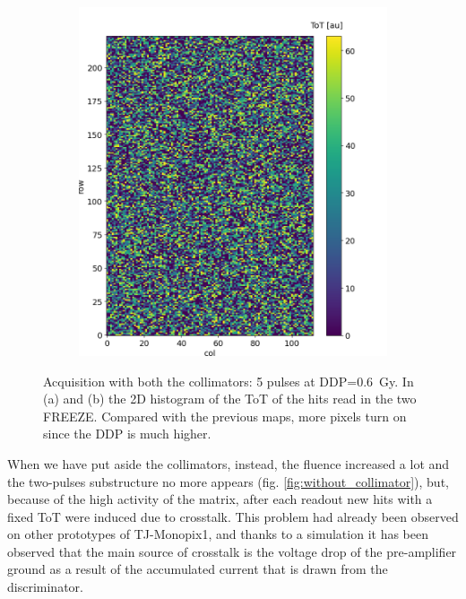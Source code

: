 \begin{figure}
\begin{subfigure}[b]{0.49\textwidth}
         \includegraphics[width=\linewidth]{figures/test_beam/tot_mapq2_15-57.png}  
         \caption{}
         \label{fig:aa2}
     \end{subfigure}
      \caption{Acquisition with both the collimators: 5 pulses at DDP=\SI{0.6}{Gy}. In (a) and (b) the 2D histogram of the ToT of the hits read in the two FREEZE. Compared with the previous maps, more pixels turn on since the DDP is much higher.}
      \label{fig:hit_map_full_matrix}
  \end{figure}

   When we have put aside the collimators, instead, the fluence increased a lot and the two-pulses substructure no more appears (fig. \ref{fig:without_collimator}), but, because of the high activity of the matrix, after each readout new hits with a fixed ToT were induced due to crosstalk.  
   This problem had already been observed on other prototypes of TJ-Monopix1, and thanks to a simulation it has been observed that the main source of crosstalk is the voltage drop of the pre-amplifier ground as a result of the accumulated current that is drawn from the discriminator.   
   

